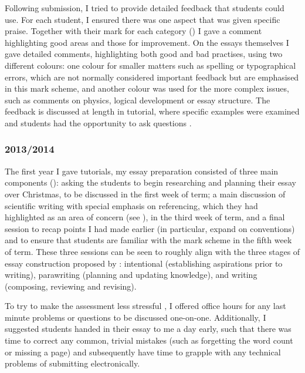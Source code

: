 Following submission, I tried to provide detailed feedback that students could use. For each student, I ensured there was one aspect that was given specific praise\citep{Henderlong2002}. Together with their mark for each category () I gave a comment highlighting good areas and those for improvement. On the essays themselves I gave detailed comments, highlighting both good and bad practises, using two different colours: one colour for smaller matters such as spelling or typographical errors, which are not normally considered important feedback \citep[chapter 4]{Irons2008} but are emphasised in this mark scheme, and another colour was used for the more complex issues, such as comments on physics, logical development or essay structure. The feedback is discussed at length in tutorial, where specific examples were examined and students had the opportunity to ask questions \citep[chapter 2]{Irons2008}.

\subsubsection{2013/2014}\label{sec:teach2013-14}

The first year I gave tutorials, my essay preparation consisted of three main components (): asking the students to begin researching and planning their essay over Christmas, to be discussed in the first week of term; a main discussion of scientific writing with special emphasis on referencing, which they had highlighted as an area of concern (see ), in the third week of term, and a final session to recap points I had made earlier (in particular, expand on conventions) and to ensure that students are familiar with the mark scheme \citep{Bell2012} in the fifth week of term. These three sessions can be seen to roughly align with the three stages of essay construction proposed by \citet{Biggs1988}: intentional (establishing aspirations prior to writing), parawriting (planning and updating knowledge), and writing (composing, reviewing and revising).

To try to make the assessment less stressful \citep[chapter 10]{Ramsden1992}, I offered office hours for any last minute problems or questions to be discussed one-on-one. Additionally, I suggested students handed in their essay to me a day early, such that there was time to correct any common, trivial mistakes (such as forgetting the word count or missing a page) and subsequently have time to grapple with any technical problems of submitting electronically.

